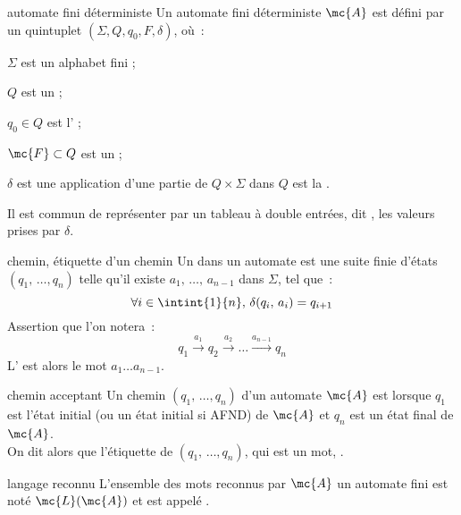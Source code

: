 

\begin{adjustwidth}{-3cm}{-3cm}


\begin{definition}{2.1}{automate fini déterministe}
    Un automate fini déterministe ${\mc{A}}$ est défini par un quintuplet $(\Sigma, Q, q_0, F, \delta)$, où~:
    \begin{enumeratebf}
        \item $\Sigma$ est un alphabet fini ;
        \item $Q$ est un  ;
        \item $q_0 \in Q$ est l' ;
        \item $\mc{F} \subset Q$ est un  ;
        \item $\delta$ est une application d'une partie de $Q \times \Sigma$ dans $Q$ est la .
    \end{enumeratebf}
    Il est commun de représenter par un tableau à double entrées, dit , les valeurs prises par $\delta$.
\end{definition}

\begin{definition}{2.2}{chemin, étiquette d'un chemin}
    Un  dans un automate est une suite finie d'états $(q_1,\, \dots,q_n)$ telle qu'il existe $a_1,\, \dots,\, a_{n-1}$ dans $\Sigma$, tel que~:
    $$\forall i \in \intint{1}{n},\, \delta(q_i,\, a_i) = q_{i+1}$$ 
    Assertion que l'on notera~:
    $$q_1 \xrightarrow{a_1} q_2 \xrightarrow{a_2} \dots \xrightarrow{a_{n-1}} q_n$$
    L' est alors le mot $a_1 \dots a_{n-1}$.
\end{definition}

\begin{definition}{2.3}{chemin acceptant}
    Un chemin $(q_1,\, \dots,q_n)$ d'un automate $\mc{A}$ est  lorsque $q_1$ est l'état initial (ou un état initial si AFND) de $\mc{A}$ et $q_n$ est un état final de $\mc{A}$.\\
    On dit alors que l'étiquette de $(q_1,\, \dots,q_n)$, qui est un mot, .
\end{definition}

\begin{definition}{2.4}{langage reconnu}
    L'ensemble des mots reconnus par $\mc{A}$ un automate fini est noté $\mc{L}(\mc{A})$ et est appelé .
\end{definition}


\end{adjustwidth}
